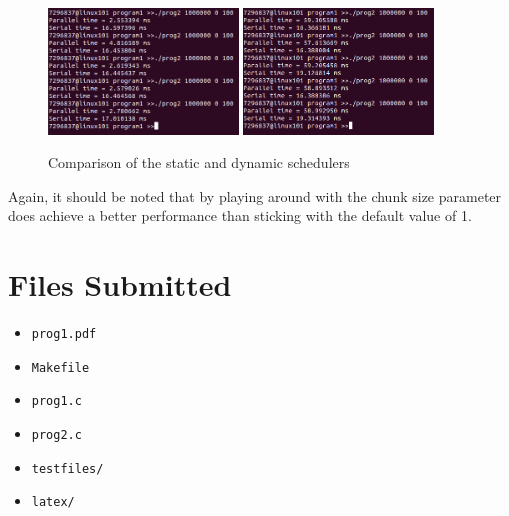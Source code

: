 \documentclass{article}
\begin{document}
\begin{figure}[ht]
	\centering
    \includegraphics[width=0.45\textwidth]{prog2_timing_static.png}\quad
    \includegraphics[width=0.45\textwidth]{prog2_timing_dynamic.png}\quad
    \caption{Comparison of the static and dynamic schedulers}
    \label{fig:prog2_static_dynamic}
\end{figure}

\noindent 
Again, it should be noted that by playing around with the chunk size parameter does achieve a better performance than sticking with the default value of 1.

\section{Files Submitted}
\begin{itemize}
    \item \texttt{prog1.pdf}
    \item \texttt{Makefile}
    \item \texttt{prog1.c}
    \item \texttt{prog2.c}
    \item \texttt{testfiles/}
    \item \texttt{latex/}
\end{itemize}
\end{document}
